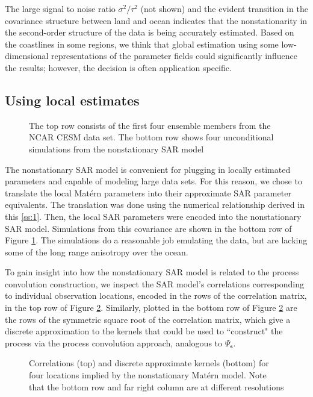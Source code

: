 \documentclass[review]{elsarticle}
\begin{document}
The large signal to noise ratio $\sigma^2/\tau^2$ (not shown) and the evident transition in the covariance structure between land and ocean indicates that the nonstationarity in the second-order structure of the data is being accurately estimated. Based on the coastlines in some regions, we think that global estimation using some low-dimensional representations of the parameter fields could significantly influence the results; however, the decision is often application specific.



\subsection{Using local estimates}

\begin{figure}
    \centering
    \caption{The top row consists of the first four ensemble members from the NCAR CESM data set. The bottom row shows four unconditional simulations from the nonstationary SAR model}
    \label{f:4}
\end{figure}


The nonstationary SAR model is convenient for plugging in locally estimated parameters and capable of modeling large data sets. For this reason, we chose to translate the local Mat\'ern parameters into their approximate SAR parameter equivalents. The translation was done using the numerical relationship derived in this \ref{ss:1}. Then, the local SAR parameters were encoded into the nonstationary SAR model. Simulations from this covariance are shown in the bottom row of Figure \ref{f:4}. The simulations do a reasonable job emulating the data, but are lacking some of the long range anisotropy over the ocean.

To gain insight into how the nonstationary SAR model is related to the process convolution construction, we inspect the SAR model's correlations corresponding to individual observation locations, encoded in the rows of the correlation matrix, in the top row of Figure \ref{f:5}. Similarly, plotted in the bottom row of Figure \ref{f:5} are the rows of the symmetric square root of the correlation matrix, which give a discrete approximation to the kernels that could be used to ``construct" the process via the process convolution approach, analogous to $ \Psi_{\mathbf{s}}$. 


\begin{figure}
    \centering
    \caption{Correlations (top) and discrete approximate kernels (bottom) for four locations implied by the nonstationary Mat\'ern model. Note that the bottom row and far right column are at different resolutions}
    \label{f:5}
\end{figure}
\end{document}

